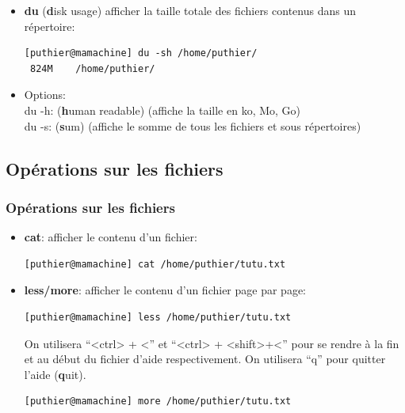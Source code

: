 \documentclass[10pt, xcolor=dvipsnames]{beamer}
\begin{document}
\begin{frame}[fragile]
        \begin{itemize}


           \item \textbf{du} (\textbf{d}isk usage) afficher la taille totale des fichiers contenus dans un répertoire:\\
           \begin{verbatim}
[puthier@mamachine] du -sh /home/puthier/
 824M    /home/puthier/
           \end{verbatim}

            \item Options:\\
            du -h: (\textbf{h}uman readable) (affiche la taille en ko, Mo, Go)\\

            du -s: (\textbf{s}um) (affiche le somme de tous les fichiers et sous répertoires)

        \end{itemize}

\end{frame}


\subsection{Opérations sur les fichiers}

\begin{frame}[fragile]

\frametitle{Opérations sur les fichiers}

        \begin{itemize}

           \item \textbf{cat}: afficher le contenu d'un fichier:
          \begin{verbatim}
[puthier@mamachine] cat /home/puthier/tutu.txt
          \end{verbatim}

           \item \textbf{less/more}: afficher le contenu d'un fichier page par page:
          \begin{verbatim}
[puthier@mamachine] less /home/puthier/tutu.txt
          \end{verbatim}
            On utilisera ``<ctrl> + <'' et ``<ctrl> + <shift>+<'' pour se rendre à la fin et au début du fichier d'aide respectivement.
            On utilisera ``q'' pour quitter l'aide (\textbf{q}uit).
          \begin{verbatim}
[puthier@mamachine] more /home/puthier/tutu.txt
          \end{verbatim}

        \end{itemize}

\end{frame}
\end{document}
